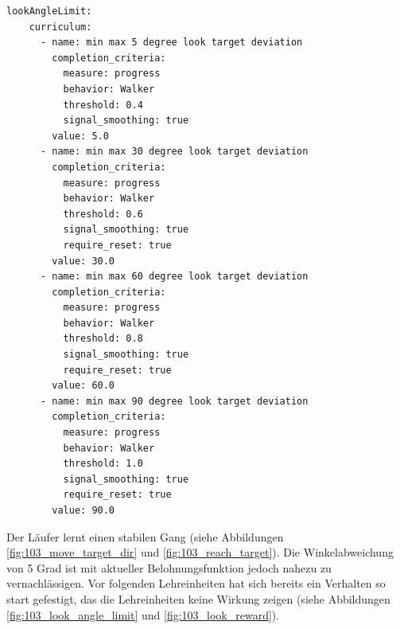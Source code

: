 \begin{lstlisting}[caption={ Lehrplan für das Blickziel},captionpos=b,label={lst:lehrplan_blickziel}]
lookAngleLimit:
    curriculum:
      - name: min max 5 degree look target deviation
        completion_criteria:
          measure: progress
          behavior: Walker
          threshold: 0.4
          signal_smoothing: true
        value: 5.0
      - name: min max 30 degree look target deviation
        completion_criteria:
          measure: progress
          behavior: Walker
          threshold: 0.6
          signal_smoothing: true
          require_reset: true
        value: 30.0
      - name: min max 60 degree look target deviation
        completion_criteria:
          measure: progress
          behavior: Walker
          threshold: 0.8
          signal_smoothing: true
          require_reset: true
        value: 60.0
      - name: min max 90 degree look target deviation
        completion_criteria:
          measure: progress
          behavior: Walker
          threshold: 1.0
          signal_smoothing: true
          require_reset: true
        value: 90.0
\end{lstlisting}

Der Läufer lernt einen stabilen Gang (siehe Abbildungen \ref{fig:103_move_target_dir} und \ref{fig:103_reach_target}). Die Winkelabweichung von 5 Grad ist mit aktueller Belohnungsfunktion jedoch nahezu zu vernachlässigen. Vor folgenden Lehreinheiten hat sich bereits ein Verhalten so start gefestigt, das die Lehreinheiten keine Wirkung zeigen (siehe Abbildungen \ref{fig:103_look_angle_limit} und \ref{fig:103_look_reward}).

